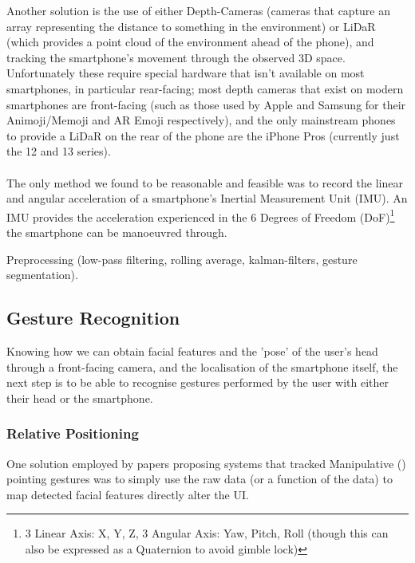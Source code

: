 Another solution is the use of either Depth-Cameras (cameras that capture an array representing the distance to something in the environment) or LiDaR (which provides a point cloud of the environment ahead of the phone), and tracking the smartphone's movement through the observed 3D space.
Unfortunately these require special hardware that isn't available on most smartphones, in particular rear-facing; most depth cameras that exist on modern smartphones are front-facing (such as those used by Apple and Samsung for their Animoji/Memoji and AR Emoji respectively), and the only mainstream phones to provide a LiDaR on the rear of the phone are the iPhone Pros (currently just the 12 and 13 series).
\\\\
The only method we found to be reasonable and feasible was to record the linear and angular acceleration of a smartphone's Inertial Measurement Unit (IMU)\cite{mantyla2000hand, kratz2013combining, neelasagar2015real, garcia2014contextualized}. 
An IMU provides the acceleration experienced in the 6 Degrees of Freedom (DoF)\footnote{3 Linear Axis: X, Y, Z, 3 Angular Axis: Yaw, Pitch, Roll (though this can also be expressed as a Quaternion to avoid gimble lock)} the smartphone can be manoeuvred through.

Preprocessing (low-pass filtering, rolling average, kalman-filters, gesture segmentation).

\subsection{Gesture Recognition}
Knowing how we can obtain facial features and the 'pose' of the user's head through a front-facing camera, and the localisation of the smartphone itself, the next step is to be able to recognise gestures performed by the user with either their head or the smartphone.

\subsubsection{Relative Positioning}\nl
One solution employed by papers proposing systems that tracked Manipulative () pointing gestures was to simply use the raw data (or a function of the data) to map detected facial features directly alter the UI.

